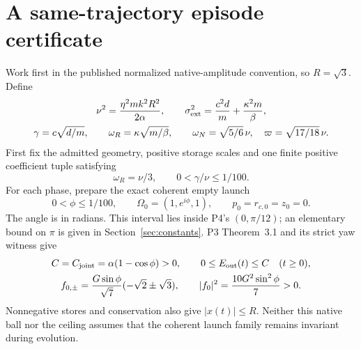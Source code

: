 \section{A same-trajectory episode certificate}\label{sec:theorem}
Work first in the published normalized native-amplitude convention, so $R=\sqrt3$. Define
\begin{equation}\label{eq:rates}%
\begin{gathered}
 \nu^2=\frac{\eta^2mk^2R^2}{2\alpha},\qquad
 \sigma_{\rm ext}^2=\frac{c^2d}{m}+\frac{\kappa^2m}{\beta},\\
 \gamma=c\sqrt{d/m},\qquad \omega_R=\kappa\sqrt{m/\beta},\qquad
 \omega_N=\sqrt{5/6}\,\nu,\quad \varpi=\sqrt{17/18}\,\nu .
\end{gathered}
\end{equation}
First fix the admitted geometry, positive storage scales and one finite positive coefficient tuple satisfying
\begin{equation}\label{eq:regime}%
 \omega_R=\nu/3,\qquad 0<\gamma/\nu\le1/100 .
\end{equation}
For each phase, prepare the exact coherent empty launch
\begin{equation}\label{eq:launch}%
 0<\phi\le1/100,\qquad
 \Omega_0=(1,e^{i\phi},1),\qquad p_0=r_{c,0}=z_0=0 .
\end{equation}
The angle is in radians. This interval lies inside P4's $(0,\pi/12)$; an elementary bound on $\pi$ is given in Section~\ref{sec:constants}. P3 Theorem~3.1 and its strict yaw witness give
\begin{equation}\label{eq:ceiling}%
\begin{gathered}
 C=C_{\rm joint}=\alpha(1-\cos\phi)>0,\qquad
 0\le E_{\rm out}(t)\le C\quad(t\ge0),\\
 f_{0,\pm}=\frac{G\sin\phi}{\sqrt7}(-\sqrt2\pm\sqrt3),\qquad
 |f_0|^2=\frac{10G^2\sin^2\phi}{7}>0.
\end{gathered}
\end{equation}
Nonnegative stores and conservation also give $|x(t)|\le R$. Neither this native ball nor the ceiling assumes that the coherent launch family remains invariant during evolution.

